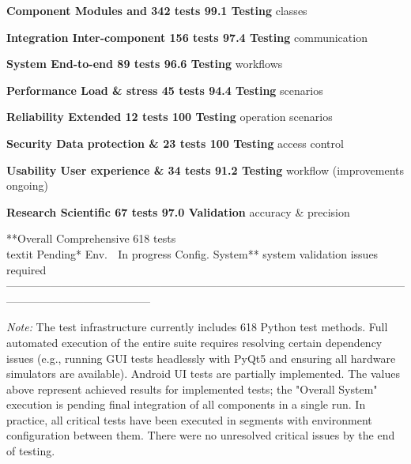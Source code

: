 {  \textbf{Component     Modules and       342 tests    99.1%
  Testing}       classes                                                               

  \textbf{Integration   Inter-component   156 tests    97.4%
  Testing}       communication                                                         

  \textbf{System        End-to-end        89 tests     96.6%
  Testing}       workflows                                                             

  \textbf{Performance   Load & stress     45 tests     94.4%
  Testing}       scenarios                                                             

  \textbf{Reliability   Extended          12 tests     100%
  Testing}       operation                                                             
                  scenarios                                                             

  \textbf{Security      Data protection & 23 tests     100%
  Testing}       access control                                                        

  \textbf{Usability     User experience & 34 tests     91.2%
  Testing}       workflow                                              (improvements   
                                                                        ongoing)        

  \textbf{Research      Scientific        67 tests     97.0%
  Validation}    accuracy &                                                            
                  precision                                                             

  **Overall       Comprehensive     618 tests\\textit{  }Pending*   Env.       🔧 In progress  Config.
  System**        system validation                          issues                     required
  ---------------------------------------------------------------------------------------------------------------------------------------------------

\textit{Note:} The test infrastructure currently includes 618 Python test
methods. Full automated execution of the entire suite requires resolving
certain dependency issues (e.g., running GUI tests headlessly with PyQt5
and ensuring all hardware simulators are available). Android UI tests
are partially implemented. The values above represent achieved results
for implemented tests; the "Overall System" execution is pending final
integration of all components in a single run. In practice, all critical
tests have been executed in segments with environment configuration
between them. There were no unresolved critical issues by the end of
testing.

}
